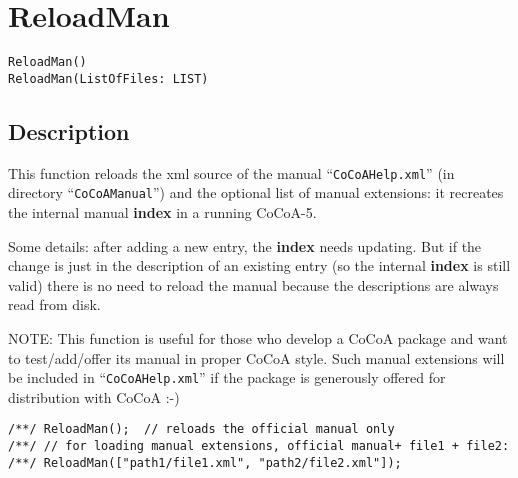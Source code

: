 \documentclass[a4paper]{mybook}
\newenvironment{command}{}{} %
\begin{document}
\section{ReloadMan}
\label{ReloadMan}
\begin{command} %


\begin{Verbatim}[label=syntax, rulecolor=\color{MidnightBlue},
frame=single]
ReloadMan()
ReloadMan(ListOfFiles: LIST)
\end{Verbatim}


\subsection*{Description}

This function reloads the xml source of the manual ``\verb&CoCoAHelp.xml&''
(in directory ``\verb&CoCoAManual&'') and the optional list of manual extensions:
it recreates the internal manual \textbf{index} in a running CoCoA-5.
\par 
Some details: after adding a new entry, the \textbf{index} needs updating.
But if the change is just in the description of an existing entry (so the
internal \textbf{index} is still valid) there is no need to reload the manual
because the descriptions are always read from disk.
\par 
NOTE: This function is useful for those who develop a CoCoA package
and want to test/add/offer its manual in proper CoCoA style.  Such
manual extensions will be included in ``\verb&CoCoAHelp.xml&'' if the
package is generously offered for distribution with CoCoA :-)
\begin{Verbatim}[label=example, rulecolor=\color{PineGreen}, frame=single]
/**/ ReloadMan();  // reloads the official manual only
/**/ // for loading manual extensions, official manual+ file1 + file2:
/**/ ReloadMan(["path1/file1.xml", "path2/file2.xml"]);
\end{Verbatim}


\end{command} %
\end{document}
